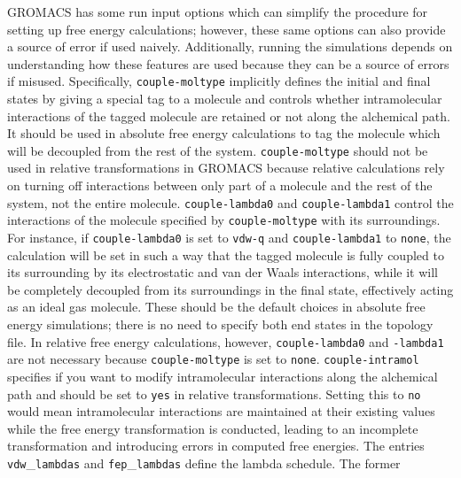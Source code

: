 \documentclass[journal=jctcce,manuscript=article]{achemso}
\newcommand{\inpopt}[1]{\texttt{#1}}
\begin{document}
GROMACS has some run input options which can simplify the procedure for setting up 
free energy calculations; however, these same options can also provide a source of error
if used naively. Additionally, running the simulations depends on understanding how these 
features are used because they can be a source of errors if misused. 
Specifically, \inpopt{couple-moltype} implicitly defines the initial and final states by giving a special tag
to a molecule and controls whether intramolecular interactions of the tagged molecule are 
retained or not along the alchemical path.
It should be used in absolute free energy calculations to tag the molecule which will be 
decoupled from the rest of the system. \inpopt{couple-moltype} should not be used in 
relative transformations in GROMACS because relative calculations rely on turning off 
interactions between only part of a molecule and the rest of the system, not the entire 
molecule. 
\inpopt{couple-lambda0} and \inpopt{couple-lambda1} control the interactions of the molecule
specified by \inpopt{couple-moltype} with its surroundings. For instance, if \inpopt{couple-lambda0}
is set to \inpopt{vdw-q} and \inpopt{couple-lambda1} to \inpopt{none}, the calculation will be set
in such a way that the tagged molecule is fully coupled to its surrounding by its electrostatic and
van der Waals interactions, while it will be completely decoupled from its surroundings in
the final state, effectively acting as an ideal gas molecule. These should be the default choices in
absolute free energy simulations; there is no need to specify both end states in the topology file.
In relative free energy calculations, however, \inpopt{couple-lambda0} and \inpopt{-lambda1} are
not necessary because \inpopt{couple-moltype} is set to \inpopt{none}. 
\inpopt{couple-intramol} specifies if you want to modify intramolecular interactions along the alchemical 
path and should be set to \inpopt{yes} in relative transformations.
Setting this to \inpopt{no} would mean intramolecular interactions are maintained at their existing values 
while the free energy transformation is conducted, leading to an incomplete transformation and 
introducing errors in computed free energies.
The entries \inpopt{vdw}\_\inpopt{lambdas} and \inpopt{fep}\_\inpopt{lambdas} define the lambda schedule. The former
\end{document}
